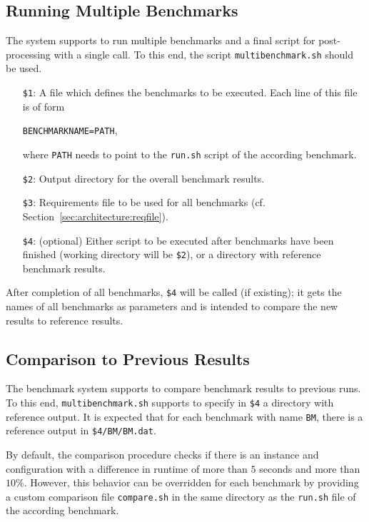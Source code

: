 \documentclass[a4paper]{article}
\begin{document}
		\subsection{Running Multiple Benchmarks}
		\label{sec:advanced:multiple}
					
			The system supports to run multiple benchmarks and a final script for post-processing with a single call.
			To this end, the script {\tt multibenchmark.sh} should be used.

			\medskip{}
			\begin{itemize}
				\item[{\tt \$1}:] A file which defines the benchmarks to be executed.
					Each line of this file is of form
					\begin{center}
						{\tt BENCHMARKNAME=PATH},
					\end{center}
					where {\tt PATH} needs to point to the {\tt run.sh} script of the according benchmark.
				\item[{\tt \$2}:] Output directory for the overall benchmark results.
				\item[{\tt \$3}:] Requirements file to be used for all benchmarks (cf. Section~\ref{sec:architecture:reqfile}).
				\item[{\tt \$4}:] (optional) Either script to be executed after benchmarks have been finished (working directory will be {\tt \$2}),
				    or a directory with reference benchmark results.
			\end{itemize}
			
			After completion of all benchmarks, {\tt \$4} will be called (if existing); it gets the names of all benchmarks as parameters
			and is intended to compare the new results to reference results.
					
		\subsection{Comparison to Previous Results}
					
			The benchmark system supports to compare benchmark results
			to previous runs.
			To this end, {\tt multibenchmark.sh}
			supports to specify in {\tt \$4} a directory with reference output.
			It is expected that for each benchmark with name {\tt BM},
			there is a reference output in {\tt \$4/BM/BM.dat}.
			
			By default, the comparison procedure checks if there is an
			instance and configuration with a difference in runtime of more than $5$ seconds and more than $10\%$.
			However, this behavior can be overridden for each benchmark
			by providing a custom comparison file {\tt compare.sh}
			in the same directory as the {\tt run.sh} file of the according benchmark.
			
\end{document}
